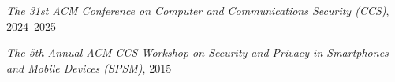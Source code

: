 \begin{innerenum}
    \item \textit{The 31st ACM Conference on Computer and Communications Security (CCS)}, 2024--2025
    \item \textit{The 5th Annual ACM CCS Workshop on Security and Privacy in Smartphones and Mobile Devices (SPSM)}, 2015    
\end{innerenum}
    